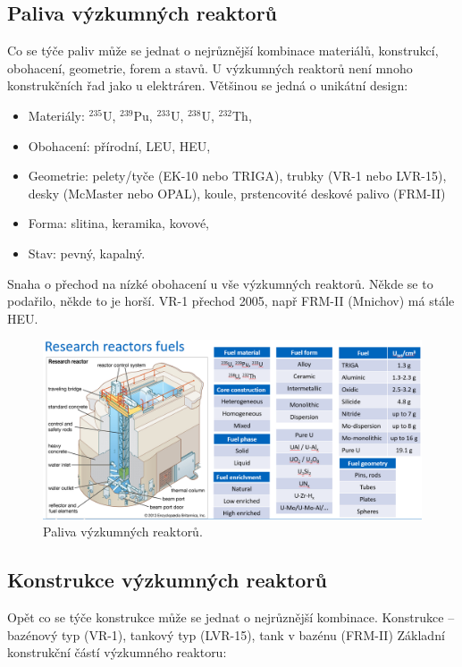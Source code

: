 \subsection{Paliva výzkumných reaktorů}

Co se týče paliv může se jednat o nejrůznější kombinace materiálů, konstrukcí, obohacení, geometrie, forem a stavů. U výzkumných reaktorů není mnoho konstrukčních řad jako u elektráren. Většinou se jedná o unikátní design:

\begin{itemize}
    \item Materiály: $^{235}$U, $^{239}$Pu, $^{233}$U, $^{238}$U, $^{232}$Th,
    \item Obohacení: přírodní, LEU, HEU,
    \item Geometrie: pelety/tyče (EK-10 nebo TRIGA), trubky (VR-1 nebo LVR-15), desky (McMaster nebo OPAL), koule, prstencovité deskové palivo (FRM-II)
    \item Forma: slitina, keramika, kovové,
    \item Stav: pevný, kapalný.
\end{itemize}

Snaha o přechod na nízké obohacení u vše výzkumných reaktorů. Někde se to podařilo, někde to je horší. VR-1 přechod 2005, např FRM-II (Mnichov) má stále HEU.

\begin{figure}[H]
    \centering
    \includegraphics[width=0.75\linewidth]{img/PalivaVýzkumnýchReaktorů.png}
    \caption{Paliva výzkumných reaktorů.}
    \label{fig:enter-label}
\end{figure}

\subsection{Konstrukce výzkumných reaktorů}

Opět co se týče konstrukce může se jednat o nejrůznější kombinace.
Konstrukce -- bazénový typ (VR-1), tankový typ (LVR-15), tank v bazénu (FRM-II)
Základní konstrukční částí výzkumného reaktoru:

